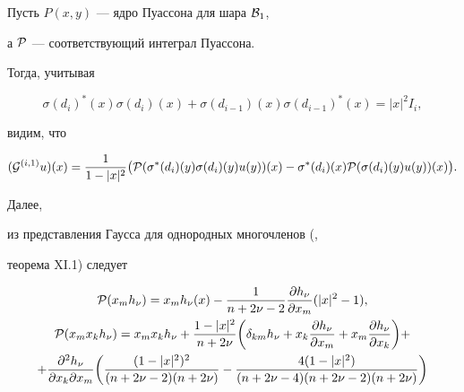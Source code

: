 \begin{pf}


Пусть $P(x,y)$ --- ядро Пуассона для шара ${\cal B}_1$,


а ${\cal P}$ --- соответствующий интеграл Пуассона.


Тогда, учитывая


$$


\sigma (d_i)^* (x)\sigma (d_i) (x) +


\sigma (d_{i-1}) (x)\sigma (d_{i-1})^* (x)=|x|^2 I_i,$$


видим, что


\begin{equation}\label{eq.MHnu1}


({\cal G}^{(i,1)} u) (x)=\frac{1}{1-|x|^2}


\big({\cal P}(\sigma^* (d_i) (y) \sigma (d_i) (y) u (y))(x) -


\sigma ^* (d_i) (x) {\cal P}(\sigma (d_i) (y) u(y)) (x) \big).


\end{equation}





Далее,


из представления Гаусса для однородных многочленов (\cite{So},


теорема XI.1) следует


\begin{gather}\label{eq.Ph1}


{\cal P} (x_m h_\nu)=x_m h_\nu (x) - \frac{1}{n+2\nu -2}


\frac{\partial h_\nu}{\partial x_m} (|x|^2 -1), \\


%


{\cal P} (x_m x_k h_\nu)=x_m x_k h_\nu +


\frac{1-|x|^2}{n+2\nu}


\bigg(\delta_{km} h_\nu +


x_k \frac{\partial h_\nu }{\partial x_m} +


x_m \frac{\partial h_\nu }{\partial x_k}


\bigg)+\notag \\


%


\label{eq.Ph2}


+\frac{\partial ^2 h_\nu }{\partial x_k \partial x_m}


\bigg(\frac{(1-|x|^2)^2}{(n+2\nu -2)(n+2\nu)} -


\frac{4(1-|x|^2)}{(n+2\nu -4)(n+2\nu -2)(n+2\nu)}\bigg)



\end{gather}
\end{pf}
